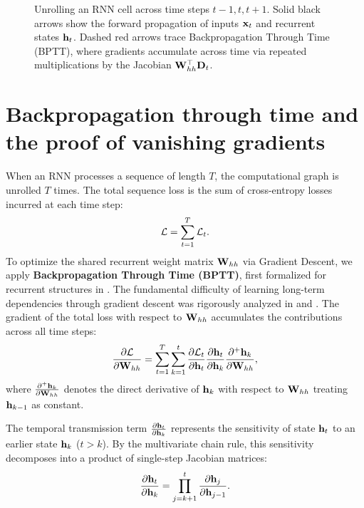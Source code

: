 \documentclass[../../main.tex]{subfiles}
\begin{document}
\begin{figure}[htbp]
{%
}
\caption{Unrolling an RNN cell across time steps $t-1, t, t+1$. Solid black arrows show the forward propagation of inputs $\mathbf{x}_t$ and recurrent states $\mathbf{h}_t$. Dashed red arrows trace Backpropagation Through Time (BPTT), where gradients accumulate across time via repeated multiplications by the Jacobian $\mathbf{W}_{hh}^\top \mathbf{D}_t$.}
\label{fig:unrolled_rnn}
\end{figure}

\clearpage
\section{Backpropagation through time and the proof of vanishing gradients}
\label{sec:bptt_proof}

When an RNN processes a sequence of length $T$, the computational graph is unrolled $T$ times. The total sequence loss is the sum of cross-entropy losses incurred at each time step:
\begin{equation}
\label{eq:total_rnn_loss}
\mathcal{L} = \sum_{t=1}^T \mathcal{L}_t.
\end{equation}
To optimize the shared recurrent weight matrix $\mathbf{W}_{hh}$ via Gradient Descent, we apply \textbf{Backpropagation Through Time (BPTT)}, first formalized for recurrent structures in \cite{werbos1990}. The fundamental difficulty of learning long-term dependencies through gradient descent was rigorously analyzed in \cite{bengio1994} and \cite{pascanu2013difficulty}. The gradient of the total loss with respect to $\mathbf{W}_{hh}$ accumulates the contributions across all time steps:
\begin{equation}
\label{eq:bptt_grad_whh}
\frac{\partial \mathcal{L}}{\partial \mathbf{W}_{hh}} = \sum_{t=1}^T \sum_{k=1}^t \frac{\partial \mathcal{L}_t}{\partial \mathbf{h}_t} \frac{\partial \mathbf{h}_t}{\partial \mathbf{h}_k} \frac{\partial^+ \mathbf{h}_k}{\partial \mathbf{W}_{hh}},
\end{equation}
where $\frac{\partial^+ \mathbf{h}_k}{\partial \mathbf{W}_{hh}}$ denotes the direct derivative of $\mathbf{h}_k$ with respect to $\mathbf{W}_{hh}$ treating $\mathbf{h}_{k-1}$ as constant.

The temporal transmission term $\frac{\partial \mathbf{h}_t}{\partial \mathbf{h}_k}$ represents the sensitivity of state $\mathbf{h}_t$ to an earlier state $\mathbf{h}_k$ ($t > k$). By the multivariate chain rule, this sensitivity decomposes into a product of single-step Jacobian matrices:
\begin{equation}
\label{eq:temporal_jacobian_product}
\frac{\partial \mathbf{h}_t}{\partial \mathbf{h}_k} = \prod_{j=k+1}^t \frac{\partial \mathbf{h}_j}{\partial \mathbf{h}_{j-1}}.
\end{equation}
\end{document}
